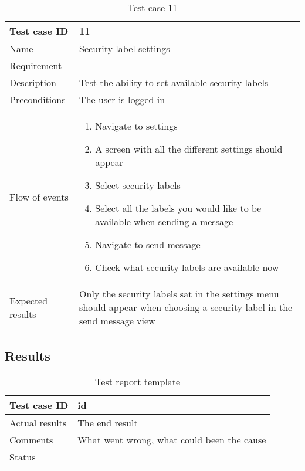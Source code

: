 \begin{table}
\begin{tabular}{l|p{10cm}}
Test case ID & 11 \\ \hline
Name & Security label settings\\ \hline
Requirement & \\ \hline
Description & Test the ability to set available security labels\\ \hline
Preconditions & The user is logged in\\ \hline
Flow of events & 
\begin{enumerate}
\item{}Navigate to settings
\item{}A screen with all the different settings should appear
\item{}Select security labels
\item{}Select all the labels you would like to be available when sending a message
\item{}Navigate to send message
\item{}Check what security labels are available now
\end{enumerate} \\ \hline
Expected results & Only the security labels sat in the settings menu should appear when choosing a security label in the send message view
\end{tabular}
\caption{Test case 11} \label{tab:case11}
\end{table}
\subsection{Results}
	\begin{table}
		\begin{tabular}{l|p{10cm}}
			Test case ID & id \\ \hline
			Actual results & The end result\\ \hline
			Comments & What went wrong, what could been the cause\\ \hline
			Status & 
		\end{tabular}
		\caption{Test report template} \label{tab:casereporttemp}
	\end{table}
	